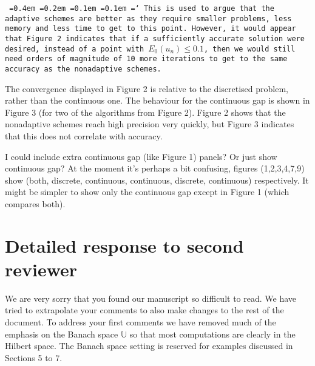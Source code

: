 \documentclass[12pt]{article}
\newcommand*\justify{%
	\fontdimen2\font=0.4em%
	\fontdimen3\font=0.2em%
	\fontdimen4\font=0.1em%
	\fontdimen7\font=0.1em%
	\hyphenchar\font=`\-%
}
\newcommand{\review}[1]{\texttt{\justify{#1}}}
\newcommand{\F}[1]{\mathbb{#1}}
\newcommand{\todo}[1]{{\color{red} #1}}
\begin{document}
\begin{enumerate}
	\review{This is used to argue that the adaptive schemes are better as they require smaller problems, less memory and less time to get to this point. However, it would appear that Figure 2 indicates that if a sufficiently accurate solution were desired, instead of a point with $E_0(u_n)\leq 0.1$, then we would still need orders of magnitude of 10 more iterations to get to the same accuracy as the nonadaptive schemes.}
	
	The convergence displayed in Figure 2 is relative to the discretised problem, rather than the continuous one. The behaviour for the continuous gap is shown in Figure 3 (for two of the algorithms from Figure 2). Figure 2 shows that the nonadaptive schemes reach high precision very quickly, but Figure 3 indicates that this does not correlate with accuracy.
	
	\todo{I could include extra continuous gap (like Figure 1) panels? Or just show continuous gap? At the moment it's perhaps a bit confusing, figures (1,2,3,4,7,9) show (both, discrete, continuous, continuous, discrete, continuous) respectively. It might be simpler to show only the continuous gap except in Figure 1 (which compares both).}
\end{enumerate}

\section{Detailed response to second reviewer}
We are very sorry that you found our manuscript so difficult to read. We have tried to extrapolate your comments to also make changes to the rest of the document. To address your first comments we have removed much of the emphasis on the Banach space $\F U$ so that most computations are clearly in the Hilbert space. The Banach space setting is reserved for examples discussed in Sections 5 to 7.
\end{document}
